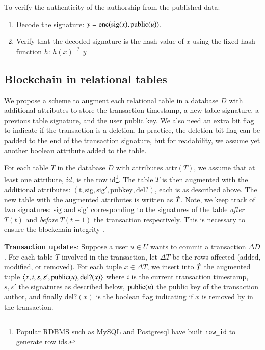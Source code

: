 To verify the authenticity of the authorship from the published data:

\begin{enumerate}
    \item Decode the signature:
        $y = \operatorname{enc}(\mathrm{sig}(x), \operatorname{public}(u))$.
    \item Verify that the decoded signature is the hash value of $x$ using the
        fixed hash function $h$:
        $ h(x) \overset{?}{=} y $
\end{enumerate}

\subsection{Blockchain in relational tables}

We propose a scheme to augment each relational table in a database $D$ with
additional attributes to store the transaction timestamp, a new table signature,
a previous table signature,
and the user public key.  We also need an extra bit flag to indicate if the
transaction is a deletion.  In practice, the deletion bit flag can be padded
to the end of the transaction signature, but for readability, we assume
yet another boolean attribute added to the table.

\newcommand{\attr}{\mathrm{attr}}
For each table $T$ in the database $D$ with attributes $\attr(T)$, we assume
that at least one attribute, $id$, is the row id\footnote{Popular RDBMS such as MySQL
and Postgresql have built {\tt row\_id} to generate row ids.}.
The table $T$ is then augmented with the additional attributes: $(\mathrm{t}, \mathrm{sig},
\mathrm{sig}', \mathrm{pubkey}, \mathrm{del?})$, each is as described above.
The new table with the augmented attributes is written as $\Hat T$.
Note, we keep track of two signatures: $\mathrm{sig}$ and $\mathrm{sig}'$
corresponding to the signatures of the table {\em after} $T(t)$ and {\em before}
$T(t-1)$
the transaction respectively.  This is necessary to ensure the blockchain
integrity \cite{dhillon2017blockchain,wang2018ablockchain}.

\medskip

{\bf Transaction updates}:  \quad Suppose a user $u\in U$ wants to commit a
transaction $\Delta D$.  For each table $T$ involved in the transaction,
let $\Delta T$ be the rows affected (added, modified, or removed).  For each
tuple $x\in\Delta T$, we insert into $\Hat T$ the augmented tuple
$\left<x, i, s, s', \operatorname{public}(u), \mathrm{del?}(x)\right>$ where
$i$ is the current transaction timestamp, $s, s'$ the signatures as
described below, $\operatorname{public}(u)$ the public key of the transaction author, and
finally $\mathrm{del?}(x)$ is the boolean flag indicating if $x$ is removed by
in the transaction.

